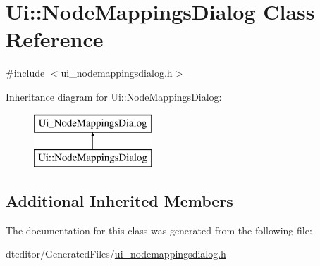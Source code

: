 \hypertarget{class_ui_1_1_node_mappings_dialog}{}\section{Ui\+::Node\+Mappings\+Dialog Class Reference}
\label{class_ui_1_1_node_mappings_dialog}


{\ttfamily \#include $<$ui\+\_\+nodemappingsdialog.\+h$>$}

Inheritance diagram for Ui\+::Node\+Mappings\+Dialog\+:\begin{figure}[H]
\begin{center}
\leavevmode
\includegraphics[height=2.000000cm]{d0/d9f/class_ui_1_1_node_mappings_dialog}
\end{center}
\end{figure}
\subsection*{Additional Inherited Members}


The documentation for this class was generated from the following file\+:\begin{DoxyCompactItemize}
\item 
dteditor/\+Generated\+Files/\mbox{\hyperlink{ui__nodemappingsdialog_8h}{ui\+\_\+nodemappingsdialog.\+h}}\end{DoxyCompactItemize}
